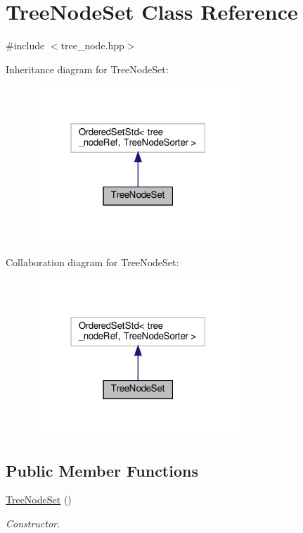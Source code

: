 \hypertarget{classTreeNodeSet}{}\section{Tree\+Node\+Set Class Reference}
\label{classTreeNodeSet}


{\ttfamily \#include $<$tree\+\_\+node.\+hpp$>$}



Inheritance diagram for Tree\+Node\+Set\+:
\nopagebreak
\begin{figure}[H]
\begin{center}
\leavevmode
\includegraphics[width=223pt]{dd/d91/classTreeNodeSet__inherit__graph}
\end{center}
\end{figure}


Collaboration diagram for Tree\+Node\+Set\+:
\nopagebreak
\begin{figure}[H]
\begin{center}
\leavevmode
\includegraphics[width=223pt]{db/d8d/classTreeNodeSet__coll__graph}
\end{center}
\end{figure}
\subsection*{Public Member Functions}
\begin{DoxyCompactItemize}
\item 
\hyperlink{classTreeNodeSet_ab97042a960b789fcf1cae69e00a7a57c}{Tree\+Node\+Set} ()
\begin{DoxyCompactList}\small\item\em Constructor. \end{DoxyCompactList}\end{DoxyCompactItemize}


